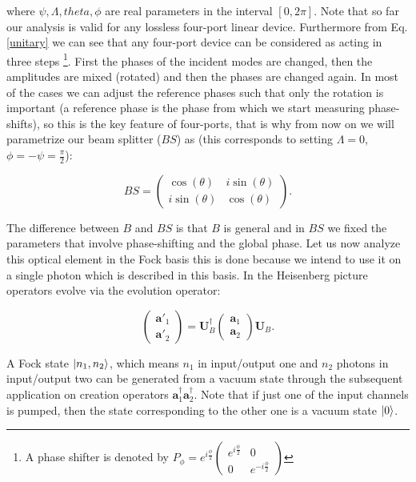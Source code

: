 \documentclass{book}
\begin{document}
{where $\psi,\Lambda,theta,\phi$ are real parameters in the interval $[0,2\pi]$. Note that so far our analysis is valid for any lossless four-port linear device. Furthermore from Eq. \ref{unitary} we can see that any four-port device can be considered as acting in three steps \footnote{A phase shifter is denoted by $P_{\phi}=e^{i \frac{\phi}{2}}\begin{pmatrix}e^{i \frac{\phi}{2}} & 0 \\0 & e^{-i \frac{\phi}{2}} \end{pmatrix}$}. First the phases of the incident modes are changed, then the amplitudes are mixed (rotated) and then the phases are changed again. In most of the cases we can adjust the reference phases such that only the rotation is important (a reference phase is the phase from which we start measuring phase-shifts), so this is the key feature of four-ports, that is why from now on we will parametrize our beam splitter ($BS$) as (this corresponds to  setting $\Lambda=0$, $\phi=-\psi=\frac{\pi}{2}$):


\begin{equation}
BS=\begin{pmatrix} \cos(\theta) & i \sin(\theta) \\ i \sin(\theta) & \cos(\theta) \end{pmatrix}.
\end{equation}


The difference between $B$ and $BS$ is that $B$ is general and in $BS$ we fixed the parameters that involve phase-shifting and the global phase. Let us now analyze this optical element in the Fock basis this is done because we intend to use it on a single photon which is described in this basis. In the Heisenberg picture operators evolve via the evolution operator:

\begin{equation}
\begin{pmatrix} \mathbf{a}'_{1} \\ \mathbf{a}'_{2}\end{pmatrix}=\mathbf{U}^{\dagger}_{B} \begin{pmatrix} \mathbf{a}_{1} \\ \mathbf{a}_{2}\end{pmatrix} \mathbf{U}_{B}.
\label{Heisenberg}
\end{equation}

A Fock state $\ket{n_{1},n_{2}}$, which means $n_{1}$ in input/output one and $n_{2}$ photons in input/output two can be generated from a vacuum state through the subsequent application on creation operators  $\mathbf{a}^{\dagger}_{1}\mathbf{a}^{\dagger}_{2}$. Note that if just one of the input channels is pumped, then the state corresponding to the other one is a vacuum state $\ket{0}$.

}
\end{document}
